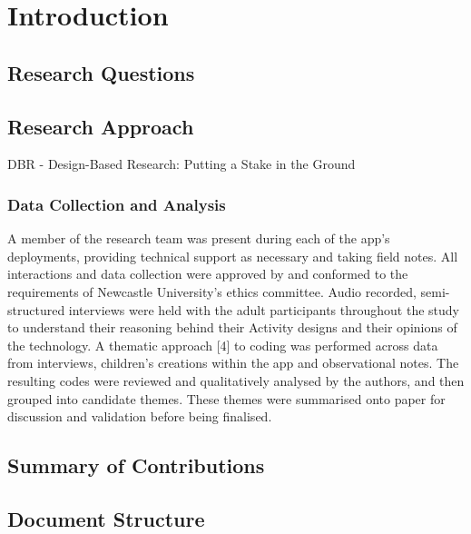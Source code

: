 \chapter{Introduction}

\section{Research Questions}

\section{Research Approach}
\label{sec:ResearchApproach}

DBR - Design-Based Research: Putting a Stake in the Ground

\subsection{Data Collection and Analysis}

A member of the research team was present during each of the app’s deployments, providing technical support as necessary and taking field notes. All interactions and data collection were approved by and conformed to the requirements of Newcastle University’s ethics committee. Audio recorded, semi-structured interviews were held with the adult participants throughout the study to understand their reasoning behind their Activity designs and their opinions of the technology. A thematic approach [4] to coding was performed across data from interviews, children’s creations within the app and observational notes. The resulting codes were reviewed and qualitatively analysed by the authors, and then grouped into candidate themes. These themes were summarised onto paper for discussion and validation before being finalised.

\section{Summary of Contributions}

\section{Document Structure}